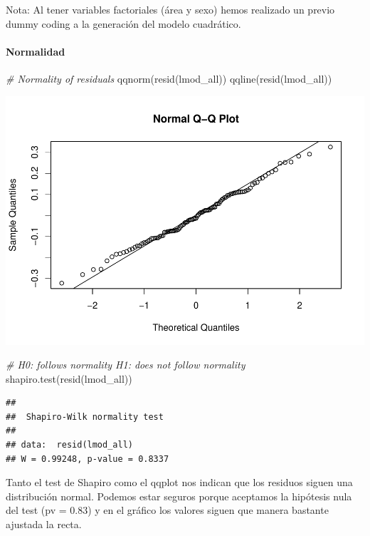 \documentclass[
]{article}
\newenvironment{Shaded}{\begin{snugshade}}{\end{snugshade}}
\newcommand{\CommentTok}[1]{\textcolor[rgb]{0.56,0.35,0.01}{\textit{#1}}}
\newcommand{\FunctionTok}[1]{\textcolor[rgb]{0.00,0.00,0.00}{#1}}
\newcommand{\NormalTok}[1]{#1}
\begin{document}
Nota: Al tener variables factoriales (área y sexo) hemos realizado un
previo dummy coding a la generación del modelo cuadrático.

\hypertarget{normalidad}{%
\paragraph{Normalidad}\label{normalidad}}

\begin{Shaded}
\begin{Highlighting}[]
\CommentTok{\# Normality of residuals}
\FunctionTok{qqnorm}\NormalTok{(}\FunctionTok{resid}\NormalTok{(lmod\_all))}
\FunctionTok{qqline}\NormalTok{(}\FunctionTok{resid}\NormalTok{(lmod\_all))}
\end{Highlighting}
\end{Shaded}

\includegraphics{code_files/figure-latex/unnamed-chunk-17-1.pdf}

\begin{Shaded}
\begin{Highlighting}[]
\CommentTok{\# H0: follows normality H1: does not follow normality}
\FunctionTok{shapiro.test}\NormalTok{(}\FunctionTok{resid}\NormalTok{(lmod\_all))}
\end{Highlighting}
\end{Shaded}

\begin{verbatim}
## 
##  Shapiro-Wilk normality test
## 
## data:  resid(lmod_all)
## W = 0.99248, p-value = 0.8337
\end{verbatim}

Tanto el test de Shapiro como el qqplot nos indican que los residuos
siguen una distribución normal. Podemos estar seguros porque aceptamos
la hipótesis nula del test (pv = 0.83) y en el gráfico los valores
siguen que manera bastante ajustada la recta.
\end{document}
